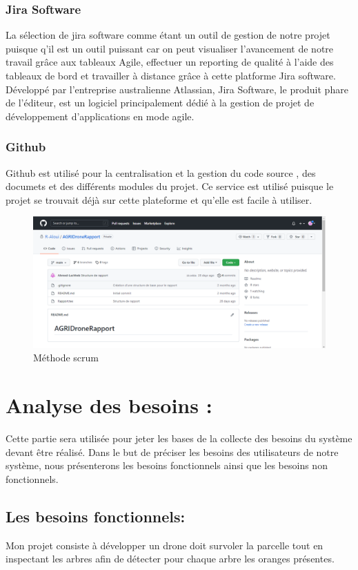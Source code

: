 	\subsubsection{Jira Software}
	La sélection de jira software comme étant un outil de gestion de notre projet puisque q'il est un outil puissant car on peut visualiser l'avancement de notre travail grâce aux tableaux Agile, effectuer un reporting de qualité à l’aide des tableaux de bord et travailler à distance grâce à cette platforme Jira software.
	Développé par l'entreprise australienne Atlassian, Jira Software, le produit phare de l'éditeur, est un logiciel principalement dédié à la gestion de projet de développement d'applications en mode agile.
	\subsubsection{Github}
	Github est utilisé pour la centralisation et la gestion du code source , des documets et des différents modules du projet. Ce service est utilisé puisque le projet se trouvait déjà sur cette plateforme et qu’elle est
	facile à utiliser.
	\begin{figure} [h]
		\begin{center}
			\centering
			\includegraphics[width=0.7\linewidth]{Images/2022-04-09 (6)}
		\end{center}
		\caption{Méthode scrum}
	\end{figure}
	\newpage
		\section{Analyse des besoins :}
		
		Cette partie sera utilisée pour jeter les bases de la collecte des besoins du système devant être réalisé.
		Dans le but de préciser les besoins des utilisateurs de notre système, nous présenterons les besoins fonctionnels 
		ainsi que les besoins non fonctionnels.
		\subsection{Les besoins fonctionnels:}
		Mon projet consiste à développer un drone doit survoler la parcelle tout en inspectant les arbres 
		afin de détecter pour chaque arbre les oranges présentes.
		
